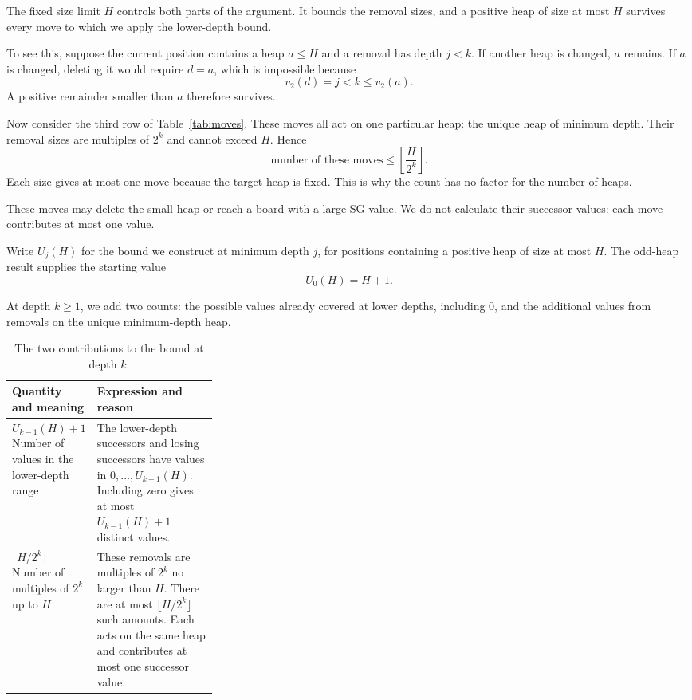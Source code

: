 \documentclass[10pt,a4paper]{article}
\begin{document}
The fixed size limit $H$ controls both parts of the argument.
It bounds the removal sizes, and a positive heap of size at
most $H$ survives every move to which we apply the lower-depth
bound.

To see this, suppose the current position contains a heap
$a\le H$ and a removal has depth $j<k$. If another heap is
changed, $a$ remains. If $a$ is changed, deleting it would
require $d=a$, which is impossible because
\[
 v_2(d)=j<k\le v_2(a).
\]
A positive remainder smaller than $a$ therefore survives.

Now consider the third row of Table~\ref{tab:moves}.
These moves all act on one particular heap: the unique heap
of minimum depth. Their removal sizes are multiples of
$2^k$ and cannot exceed $H$. Hence
\begin{equation}
 \text{number of these moves}
 \le
 \left\lfloor\frac{H}{2^k}\right\rfloor.
 \label{eq:exceptioncount}
\end{equation}
Each size gives at most one move because the target heap is
fixed. This is why the count has no factor for the number
of heaps.

These moves may delete the small heap or reach a board with
a large SG value. We do not calculate their successor values:
each move contributes at most one value.

Write $U_j(H)$ for the bound we construct at minimum depth
$j$, for positions containing a positive heap of size at
most $H$. The odd-heap result supplies the starting value
\[
 U_0(H)=H+1.
\]

At depth $k\ge1$, we add two counts: the possible values already
covered at lower depths, including $0$, and the additional values
from removals on the unique minimum-depth heap.

\begin{table}[H]
\centering
\begin{tabularx}{\linewidth}{@{}L{0.30\linewidth}Y@{}}
\toprule
Quantity and meaning & Expression and reason \\
\midrule
$U_{k-1}(H)+1$\newline
Number of values in the lower-depth range
  & The lower-depth successors and losing successors have
    values in $0,\ldots,U_{k-1}(H)$. Including zero gives
    at most $U_{k-1}(H)+1$ distinct values. \\
\addlinespace[9pt]
$\lfloor H/2^k\rfloor$\newline
Number of multiples of $2^k$ up to $H$
  & These removals are multiples of $2^k$ no larger than $H$.
    There are at most $\lfloor H/2^k\rfloor$ such amounts.
    Each acts on the same heap and contributes at most one
    successor value. \\
\bottomrule
\end{tabularx}
\caption{The two contributions to the bound at depth $k$.}
\label{tab:recursionterms}
\end{table}
\end{document}
